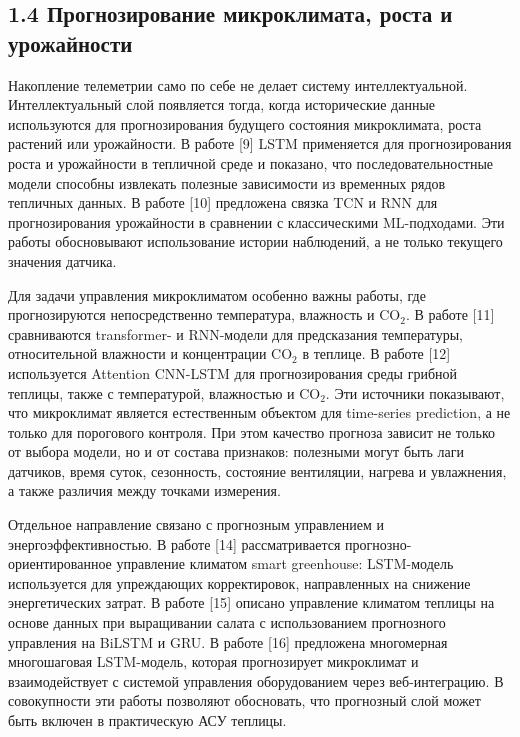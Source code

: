 \documentclass[a4paper,14pt]{extarticle}
\begin{document}
\hypertarget{ux43fux440ux43eux433ux43dux43eux437ux438ux440ux43eux432ux430ux43dux438ux435-ux43cux438ux43aux440ux43eux43aux43bux438ux43cux430ux442ux430-ux440ux43eux441ux442ux430-ux438-ux443ux440ux43eux436ux430ux439ux43dux43eux441ux442ux438}{%
\subsection{1.4 Прогнозирование микроклимата, роста и
урожайности}\label{ux43fux440ux43eux433ux43dux43eux437ux438ux440ux43eux432ux430ux43dux438ux435-ux43cux438ux43aux440ux43eux43aux43bux438ux43cux430ux442ux430-ux440ux43eux441ux442ux430-ux438-ux443ux440ux43eux436ux430ux439ux43dux43eux441ux442ux438}}

Накопление телеметрии само по себе не делает систему интеллектуальной.
Интеллектуальный слой появляется тогда, когда исторические данные
используются для прогнозирования будущего состояния микроклимата, роста
растений или урожайности. В работе {[}9{]} LSTM применяется для
прогнозирования роста и урожайности в тепличной среде и показано, что
последовательностные модели способны извлекать полезные зависимости из
временных рядов тепличных данных. В работе {[}10{]} предложена связка
TCN и RNN для прогнозирования урожайности в сравнении с классическими
ML-подходами. Эти работы обосновывают использование истории наблюдений,
а не только текущего значения датчика.

Для задачи управления микроклиматом особенно важны работы, где
прогнозируются непосредственно температура, влажность и CO\(_2\). В
работе {[}11{]} сравниваются transformer- и RNN-модели для предсказания
температуры, относительной влажности и концентрации CO\(_2\) в теплице.
В работе {[}12{]} используется Attention CNN-LSTM для прогнозирования
среды грибной теплицы, также с температурой, влажностью и CO\(_2\). Эти
источники показывают, что микроклимат является естественным объектом для
time-series prediction, а не только для порогового контроля. При этом
качество прогноза зависит не только от выбора модели, но и от состава
признаков: полезными могут быть лаги датчиков, время суток, сезонность,
состояние вентиляции, нагрева и увлажнения, а также различия между
точками измерения.

Отдельное направление связано с прогнозным управлением и
энергоэффективностью. В работе {[}14{]} рассматривается
прогнозно-ориентированное управление климатом smart greenhouse:
LSTM-модель используется для упреждающих корректировок, направленных на
снижение энергетических затрат. В работе {[}15{]} описано управление
климатом теплицы на основе данных при выращивании салата с
использованием прогнозного управления на BiLSTM и GRU. В работе {[}16{]}
предложена многомерная многошаговая LSTM-модель, которая прогнозирует
микроклимат и взаимодействует с системой управления оборудованием через
веб-интеграцию. В совокупности эти работы позволяют обосновать, что
прогнозный слой может быть включен в практическую АСУ теплицы.
\end{document}
